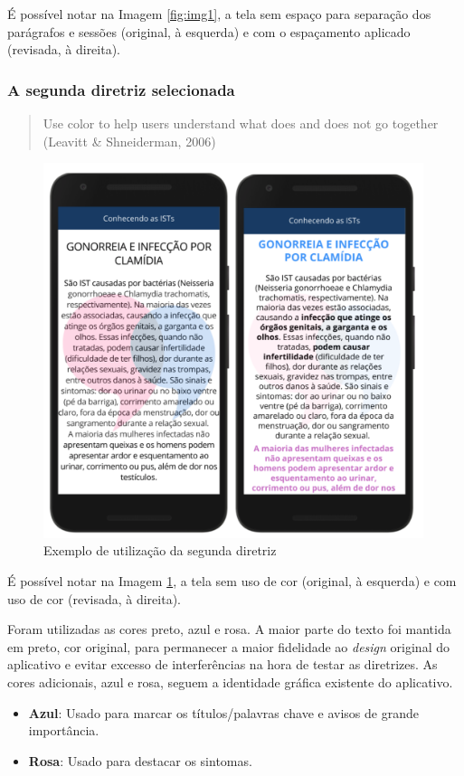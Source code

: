 \documentclass[12pt]{article}
\begin{document}
É possível notar na Imagem \ref{fig:img1}, a tela sem espaço para separação dos parágrafos e sessões (original, à esquerda) e com o espaçamento aplicado (revisada, à direita).

\subsubsection{A segunda diretriz selecionada}

\begin{quote}
	Use color to help users understand what does and does not go together (Leavitt \& Shneiderman, 2006)
\end{quote}

\begin{figure}[H]
  \centering
  \includegraphics[width=30em]{images/image_2.png}
  \caption{Exemplo de utilização da segunda diretriz}
  \label{fig:img2}
\end{figure}

É possível notar na Imagem \ref{fig:img2}, a tela sem uso de cor (original, à esquerda) e com uso de cor (revisada, à direita).

Foram utilizadas as cores preto, azul e rosa. A maior parte do texto foi mantida em preto, cor original, para permanecer a maior fidelidade ao \textit{design} original do aplicativo e evitar excesso de interferências na hora de testar as diretrizes. As cores adicionais, azul e rosa, seguem a identidade gráfica existente do aplicativo.

\begin{itemize}
\item \textbf{Azul}: Usado para marcar os títulos/palavras chave e avisos de grande importância.
\item \textbf{Rosa}: Usado para destacar os sintomas.
\end{itemize}
\end{document}
